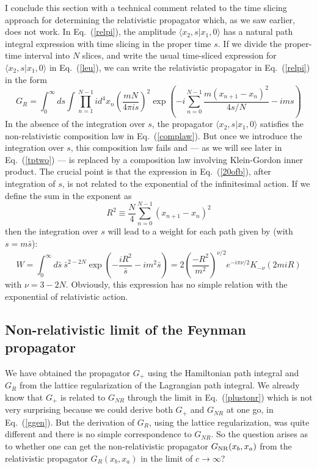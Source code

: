 \documentclass{article}
\def\eq#1{{Eq.~(\ref{#1})}}
\def\amp#1#2{\langle #1 | #2\rangle}      %
\begin{document}
I conclude this section with a technical comment related to the time slicing approach for determining the relativistic propagator which, as we saw earlier, does not work. In \eq{relpi}, the amplitude $\amp{x_2,s}{x_1,0}$ has a natural path integral expression with time slicing in the proper time $s$. If we divide the proper-time interval into $N$ slices, and write the usual time-sliced expression for $\amp{x_2,s}{x_1,0}$ in \eq{leu}, we can write  the relativistic propagator in \eq{relpi} in the form
 \begin{equation}
 G_R = \int_0^\infty ds  \int \prod^{N-1}_{n=1} id^4x_n\left(\frac{mN}{4\pi is}\right)^2 \exp\left( -i \sum_{n=0}^{N-1} \frac{m(x_{n+1} - x_n)^2}{4s/N} - i  m s\right)
  \label{20ofb}
 \end{equation} 
 In the absence of the integration over $s$, the propagator $\amp{x_2,s}{x_1,0}$ satisfies the non-relativistic composition law in \eq{complaw}. But once we introduce the integration over $s$, this composition law fails and --- as we will see later in \eq{tptwo} --- is replaced by a composition law involving Klein-Gordon inner product. The crucial point is that the expression in \eq{20ofb}, after integration of $s$, is not related to the exponential of the infinitesimal action. If we define the sum in the exponent as 
 \begin{equation}
  R^2 \equiv \frac{N}{4} \sum_{n=0}^{N-1} (x_{n+1} - x_n)^2
 \end{equation} 
 then the integration over $s$ will lead to a weight for each path given by (with $s=m\bar s$):
 \begin{equation}
 W = \int_0^\infty d\bar s\ \bar s^{2-2N} \exp \left(-\frac{iR^2}{\bar s} - i m^2\bar s \right) 
 = 2\left(\frac{-R^2}{m^2}\right)^{\nu/2}e^{-i\pi\nu/2}K_{-\nu}(2miR)
 \label{notaction}
 \end{equation} 
with $\nu=3-2N$. Obviously, this expression has no simple relation with the exponential of relativistic action. 
 

\subsection{Non-relativistic limit of the Feynman propagator}\label{sec:nroff}

We have obtained the propagator $G_+$ using the Hamiltonian path integral and $G_R$ from the lattice regularization of the Lagrangian path integral. We already know that $G_+$ is related to $G_{NR}$ through the limit in \eq{plustonr} which is not very surprising because we could derive both $G_+$ and $G_{NR}$ at one go, in \eq{ggen}. But the derivation of $G_R$, using the lattice regularization, was quite different and there is no simple correspondence to $G_{NR}$. So the question arises as to whether one can get the non-relativistic propagator $G_{\rm NR}(x_b,x_a)$ from the relativistic propagator $G_{R}(x_b,x_a)$ in the limit of $c\to\infty$? 
\end{document}

